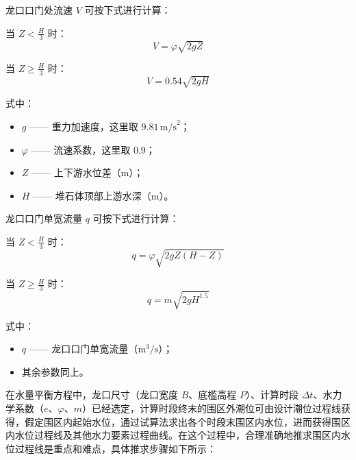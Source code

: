 \documentclass[UTF8, a4paper, 12pt]{ctexart} %
\begin{document}
龙口口门处流速 $V$ 可按下式进行计算：

当 $Z < \frac{H}{3}$ 时：
\begin{equation}
    V = \varphi \sqrt{2gZ} 
\end{equation}

当 $Z \geq \frac{H}{3}$ 时：
\begin{equation}
    V = 0.54 \sqrt{2gH} 
\end{equation}

式中：
\begin{itemize}
    \item $g$ —— 重力加速度，这里取 $9.81\,\text{m/s}^2$；
    \item $\varphi$ —— 流速系数，这里取 $0.9$；
    \item $Z$ —— 上下游水位差（m）；
    \item $H$ —— 堆石体顶部上游水深（m）。
\end{itemize}

龙口口门单宽流量 $q$ 可按下式进行计算：

当 $Z < \frac{H}{3}$ 时：
\begin{equation}
    q = \varphi \sqrt{2gZ(H-Z)} 
\end{equation}

当 $Z \geq \frac{H}{3}$ 时：
\begin{equation}
    q = m \sqrt{2gH^{1.5}} 
\end{equation}

式中：
\begin{itemize}
    \item $q$ —— 龙口口门单宽流量（$\text{m}^3/\text{s}$）；
    \item 其余参数同上。
\end{itemize}


在水量平衡方程中，龙口尺寸（龙口宽度 $B$、底槛高程 $P$）、计算时段 $\Delta t$、水力学系数（$e$、$\varphi$、$m$）已经选定，计算时段终末的围区外潮位可由设计潮位过程线获得，假定围区内起始水位，通过试算法求出各个时段末围区内水位，进而获得围区内水位过程线及其他水力要素过程曲线。在这个过程中，合理准确地推求围区内水位过程线是重点和难点，具体推求步骤如下所示：
\end{document}
